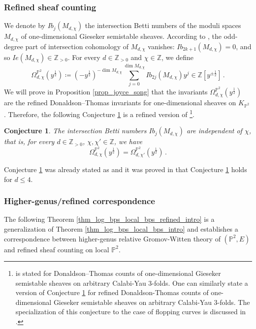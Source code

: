 \documentclass[11pt,letterpaper]{amsart}
\newtheorem{conj}[defn]{Conjecture}
\newcommand\PP{\mathbb P}
\newcommand\Z{\mathbb Z}
\begin{document}
\subsubsection{Refined sheaf counting}
We denote by $Ib_{j}(M_{d,\chi})$ the  intersection Betti numbers of the moduli spaces $M_{d,\chi}$ of one-dimensional Gieseker semistable sheaves.
According to \cite[Corollary 6.1.3]{bousseau2019scattering}, the odd-degree part of intersection cohomology of $M_{d,\chi}$ vanishes: 
$Ib_{2k+1}(M_{d,\chi})=0$, and so
$Ie(M_{d,\chi}) \in \Z_{>0}$.
For every $d \in \Z_{>0}$ and $\chi \in \Z$, we define 
\[ \Omega_{d,\chi}^{\PP^2}(y^{\frac{1}{2}}) \coloneq 
(-y^{\frac{1}{2}})^{-\dim M_{d,\chi}}
\sum_{j=0}^{\dim M_{d,\chi}}
Ib_{2j}(M_{d,\chi}) y^{j} \in \Z[y^{\pm \frac{1}{2}}]\,.\]
We will prove in Proposition \ref{prop_joyce_song} that the invariants $\Omega_{d,\chi}^{\PP^2}(y^{\frac{1}{2}})$ are the
refined Donaldson--Thomas invariants for
one-dimensional sheaves on $K_{\PP^2}$ \cite{MR2951762}.
Therefore, the following Conjecture \ref{conj_refined_joyce_conj_intro}
is a refined version of \cite[Conjecture 6.20]{MR2951762}\footnote{\cite[Conjecture 6.20]{MR2951762} is stated for Donaldson--Thomas counts of one-dimensional Gieseker semistable sheaves on arbitrary 
Calabi-Yau 3-folds. One can similarly state a version of Conjecture \ref{conj_refined_joyce_conj_intro} for refined Donaldson-Thomas counts of one-dimensional Gieseker semistable sheaves on arbitrary Calabi-Yau 3-folds. The specialization of this conjecture to the case of flopping curves is discussed in \cite{davison2019refined}. }.

\begin{conj} \label{conj_refined_joyce_conj_intro}
The intersection Betti numbers $Ib_j(M_{d,\chi})$ are independent 
of $\chi$, that is, for every 
$d\in \Z_{>0}$, $\chi, \chi' \in \Z$, we have 
\[ \Omega_{d,\chi}^{\PP^2}
(y^{\frac{1}{2}})=
\Omega_{d,\chi'}^{\PP^2}(y^{\frac{1}{2}})\,.\]
\end{conj}

Conjecture \ref{conj_refined_joyce_conj_intro} was already
stated as \cite[Conjecture 0.4.3]{bousseau2019scattering} and it was proved in 
\cite[Theorem 0.4.5]{bousseau2019scattering} that Conjecture \ref{conj_refined_joyce_conj_intro} holds for $d \leq 4$.

\subsubsection{Higher-genus/refined correspondence}
The following Theorem \ref{thm_log_bps_local_bps_refined_intro} is a generalization of Theorem \ref{thm_log_bps_local_bps_intro}
and establishes a correspondence between higher-genus 
relative Gromov-Witten theory of $(\PP^2,E)$ and refined sheaf counting on local $\PP^2$. 
\end{document}
